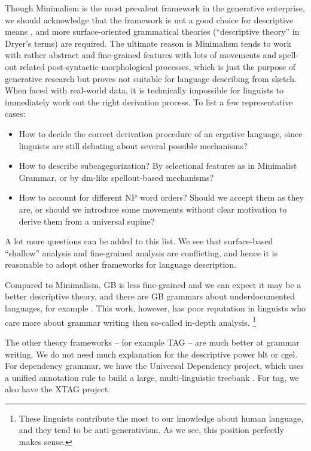 \documentclass[../main.tex]{subfiles}
\begin{document}
Though Minimalism is the most prevalent framework in the generative enterprise, we should acknowledge that 
the framework is not a good choice for descriptive means \citep{dryer2006descriptive}, and more surface-oriented
grammatical theories (``descriptive theory'' in Dryer's terms) are required. The ultimate reason is 
Minimalism tends to work with rather abstract and fine-grained features with lots of movements and spell-out related post-syntactic morphological processes, 
which is just the purpose of generative research but proves not suitable for language describing from sketch.
When faced with real-world data, it is technically impossible for linguists to immediately work out the right derivation process. To list a few representative cases:
\begin{itemize}
    \item  How to decide the correct derivation procedure of an ergative language, since 
    linguists are still debating about several possible mechanisms?
    \item How to describe subcagegorization? By selectional features as in Minimalist Grammar,
    or by \ac{dm}-like spellout-based mechanisms\citep{siddiqi2009syntax}?
    \item How to account for different NP word orders? Should we accept them as they are, or should we introduce 
    some movements without clear motivation \citep{cinque2005deriving} to derive them from a universal supine?
\end{itemize}
A lot more questions can be added to this list. We see that surface-based ``shallow'' analysis and fine-grained 
analysis are conflicting, and hence it is reasonable to adopt other frameworks for language description.

Compared to Minimalism, GB is less fine-grained and we can expect it may be a better descriptive theory,
and there are GB grammars about underdocumented languages, for example \citet{holmer1996parametric}. 
This work, however, has poor reputation in linguists who care more about grammar writing then so-called in-depth
analysis.%
\footnote{
    These linguists contribute the most to our knowledge about human language, and they tend to 
    be anti-generativism. As we see, this position perfectly makes sense.
}

The other theory frameworks -- for example TAG -- are much better at grammar writing. We do not need much explanation for 
the descriptive power \ac{blt} or \ac{cgel}. For dependency grammar, we have the Universal Dependency 
project, which uses a unified annotation rule to build a large, multi-linguistic treebank \citep{ud}.
For \ac{tag}, we also have the XTAG project. %
\end{document}
